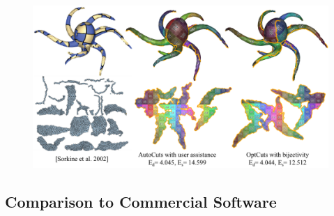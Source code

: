\begin{figure}[t]
\centering
\includegraphics[width=\linewidth]{fig/comp_AutoCuts_Olga.png}
\caption{}
\label{fig:comp_AutoCuts_Olga}
\end{figure}


\subsection{Comparison to Commercial Software}

